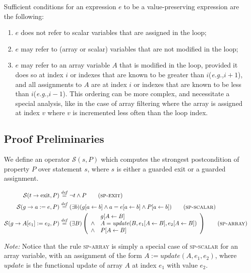 \documentclass[a4paper,10pt]{article}
\newcommand{\eg}{\textit{e.g.,}\xspace}
\newcommand{\idx}{\ensuremath{i}\xspace}
\newcommand{\KWexit}{\ensuremath{\mathrm{exit}}}
\newcommand{\patternnote}{\noindent\textit{Note:}\xspace}
\newcommand{\update}[3]{\ensuremath{\mathit{update}{(#1,#2,#3)}}\xspace}
\newcommand{\symdef}{\ensuremath{\overset{\mathit{def}}{=}}}
\newcommand{\spexit}{\textsc{sp-exit}\xspace}
\newcommand{\spscalar}{\textsc{sp-scalar}\xspace}
\newcommand{\sparray}{\textsc{sp-array}\xspace}
\begin{document}
Sufficient conditions for an expression $e$ to be a value-preserving expression
are the following:
\begin{enumerate}
\item $e$ does not refer to scalar variables that are assigned in the loop;
\item $e$ may refer to (array or scalar) variables that are not modified in the loop;
\item $e$ may refer to an array variable $A$ that is modified in the loop,
  provided it does so at index \idx or indexes that are known to be greater
  than \idx (\eg $\idx + 1$), and all assignments to $A$ are at index \idx or
  indexes that are known to be less than \idx (\eg $\idx - 1$). This ordering
  can be more complex, and necessitate a special analysis, like in the case of
  array filtering where the array is assigned at index $v$ where $v$ is
  incremented less often than the loop index.
\end{enumerate}

\subsection{Proof Preliminaries}

\newcommand{\spost}[2]{\ensuremath{\mathcal{S}(#1,#2)}}
\newcommand{\subst}[3]{\ensuremath{#1[#2 \leftarrow #3]}}

We define an operator \spost{s}{P} which computes the strongest postcondition of
property $P$ over statement $s$, where $s$ is either a guarded
exit or a guarded assignment.

\begin{align*}
\spost{t \rightarrow \KWexit}{P} &\symdef \neg t \land P \tag{\spexit}\\
\spost{g \rightarrow a:=e}{P} &\symdef (\exists b) (\subst{g}{a}{b} 
    \land a = \subst{e}{a}{b} \land \subst{P}{a}{b}) \tag{\spscalar}\\
\spost{g \rightarrow A[e_1]:=e_2}{P} &\symdef (\exists B)
\left(\begin{array}{cl}
&\subst{g}{A}{B}\\
\land& A = \update{B}{\subst{e_1}{A}{B}}{\subst{e_2}{A}{B}}\\
\land& \subst{P}{A}{B}\\
\end{array}\right)
 \tag{\sparray}\\
\end{align*}

\patternnote Notice that the rule \sparray is simply a special case of
\spscalar for an array variable, with an assignment of the form $A :=
\update{A}{e_1}{e_2}$, where $\mathit{update}$ is the functional update of
array $A$ at index $e_1$ with value $e_2$.
\end{document}

